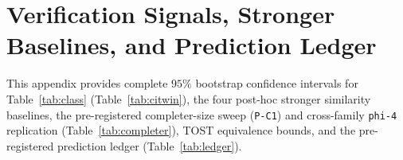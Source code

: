 \section{Verification Signals, Stronger Baselines, and Prediction Ledger}
\label{app:verification}

This appendix provides complete $95\%$ bootstrap confidence intervals for Table~\ref{tab:class} (Table~\ref{tab:citwin}), the four post-hoc stronger similarity baselines, the pre-registered completer-size sweep (\texttt{P-C1}) and cross-family \texttt{phi-4} replication (Table~\ref{tab:completer}), TOST equivalence bounds, and the pre-registered prediction ledger (Table~\ref{tab:ledger}).

